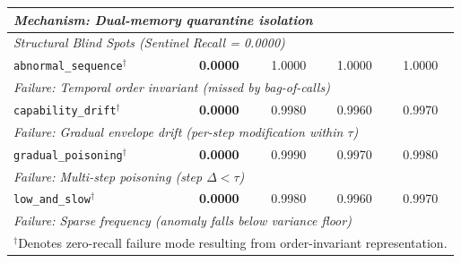 \begin{table}[t]
\begin{tabular}{lcccc}
\multicolumn{5}{l}{\quad\textit{Mechanism: Dual-memory quarantine isolation}} \\
\midrule
\multicolumn{5}{l}{\textit{Structural Blind Spots (Sentinel Recall = 0.0000)}} \\
\texttt{abnormal\_sequence}$^\dagger$ & \textbf{0.0000} & 1.0000 & 1.0000 & 1.0000 \\
\multicolumn{5}{l}{\quad\textit{Failure: Temporal order invariant (missed by bag-of-calls)}} \\
\texttt{capability\_drift}$^\dagger$  & \textbf{0.0000} & 0.9980 & 0.9960 & 0.9970 \\
\multicolumn{5}{l}{\quad\textit{Failure: Gradual envelope drift (per-step modification within $\tau$)}} \\
\texttt{gradual\_poisoning}$^\dagger$ & \textbf{0.0000} & 0.9990 & 0.9970 & 0.9980 \\
\multicolumn{5}{l}{\quad\textit{Failure: Multi-step poisoning (step $\Delta < \tau$)}} \\
\texttt{low\_and\_slow}$^\dagger$     & \textbf{0.0000} & 0.9980 & 0.9960 & 0.9970 \\
\multicolumn{5}{l}{\quad\textit{Failure: Sparse frequency (anomaly falls below variance floor)}} \\
\bottomrule
\multicolumn{5}{l}{\scriptsize $^\dagger$Denotes zero-recall failure mode resulting from order-invariant representation.}
\end{tabular}
\end{table}
